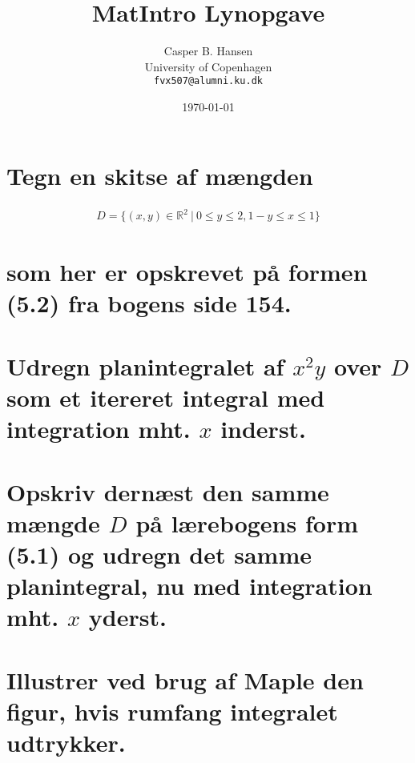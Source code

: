 \documentclass[11pt,a4paper]{article}
\title{MatIntro Lynopgave \assignmentnumber}
\author
{
    Casper B. Hansen\\
    University of Copenhagen\\
    {\tt fvx507@alumni.ku.dk}
}
\date{\today}
\begin{document}


\section
{
    \mdseries
    Tegn en skitse af mængden
}
\begin{align}
    D = \{ (x,y) \in \mathbb{R}^2{\ }|{\ }0 \leq y \leq 2, 1 - y \leq x \leq 1 \}
    \label{eqn:D}
\end{align}
\section*
{
    \mdseries
    som her er opskrevet på formen (5.2) fra bogens side 154.
    \\\\
    Udregn planintegralet af $x^2 y$ over $D$ som et itereret integral med
    integration mht. $x$ inderst.
    \\\\
    Opskriv dernæst den samme mængde $D$ på lærebogens form (5.1) og udregn
    det samme planintegral, nu med integration mht. $x$ yderst.
    \\\\
    Illustrer ved brug af Maple den figur, hvis rumfang integralet udtrykker.
}
\end{document}
